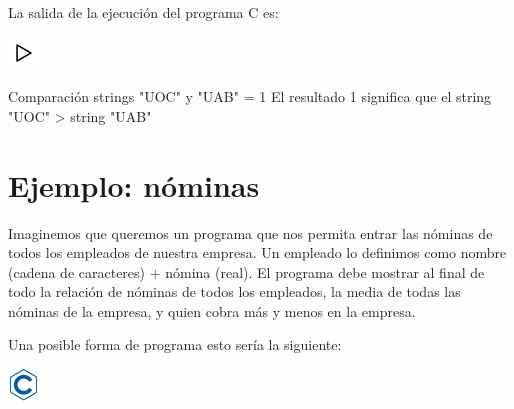 \documentclass[
]{book}
\newenvironment{Shaded}{\begin{snugshade}}{\end{snugshade}}
\newcommand{\DecValTok}[1]{\textcolor[rgb]{0.00,0.00,0.81}{#1}}
\newcommand{\NormalTok}[1]{#1}
\newcommand{\StringTok}[1]{\textcolor[rgb]{0.31,0.60,0.02}{#1}}
\begin{document}
La salida de la ejecución del programa C es:

\includegraphics{./img/play.png}

\begin{Shaded}
\begin{Highlighting}[]
\NormalTok{Comparación strings }\StringTok{"UOC"}\NormalTok{ y }\StringTok{"UAB"}\NormalTok{ = }\DecValTok{1}
\NormalTok{El resultado }\DecValTok{1}\NormalTok{ significa que el string }\StringTok{"UOC"}\NormalTok{ \textgreater{} string }\StringTok{"UAB"}
\end{Highlighting}
\end{Shaded}

\hypertarget{ejemplo-nuxf3minas}{%
\section{Ejemplo: nóminas}\label{ejemplo-nuxf3minas}}

Imaginemos que queremos un programa que nos permita entrar las nóminas de todos los empleados de nuestra empresa. Un empleado lo definimos como nombre (cadena de caracteres) + nómina (real). El programa debe mostrar al final de todo la relación de nóminas de todos los empleados, la media de todas las nóminas de la empresa, y quien cobra más y menos en la empresa.

Una posible forma de programa esto sería la siguiente:

\includegraphics{./img/c.png}
\end{document}
